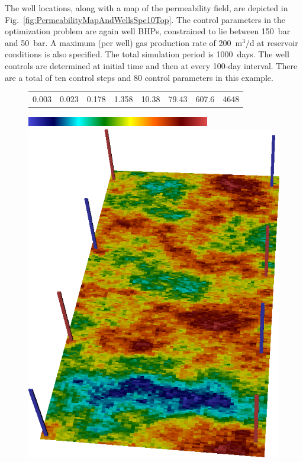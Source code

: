 \documentclass[twocolumn,numbook]{svjour3}          %
\begin{document}
The well locations, along with a map of the permeability field, are depicted in
Fig.~\ref{fig:PermeabilityMapAndWellsSpe10Top}. The control parameters in the
optimization problem are again well BHPs, constrained to lie between 150~bar and 50~bar. A
maximum (per well) gas production rate of 200~m$^3/$d at reservoir conditions is also specified.
The total simulation period is 1000~days. The well controls are determined
at initial time and then at every 100-day interval. There are a
total of ten control steps and 80 control parameters in this example.


%
\begin{figure}[ht]
\begin{center}
     \begin{tabular}{cccccccc}
      0.003 &  0.023 & 0.178 & 1.358 & 10.38 & 79.43 & 607.6 &4648
      \end{tabular}
      \includegraphics[width=8cm, height=0.5cm]{VanEssenModelPermeabilityMapColorBar.png}
       
       \medskip

       \includegraphics[totalheight=3.2in]{SPE10TopModelPermeabilityMapConstantRotated.png} %


\end{center}
\end{figure}
\end{document}
